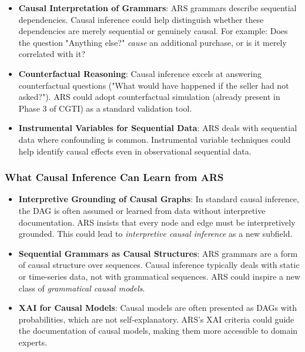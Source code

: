 \documentclass[12pt,a4paper]{article}
\begin{document}
\begin{itemize}
    \item \textbf{Causal Interpretation of Grammars}: ARS grammars describe 
    sequential dependencies. Causal inference could help distinguish whether 
    these dependencies are merely sequential or genuinely causal. For example: 
    Does the question "Anything else?" \textit{cause} an additional purchase, 
    or is it merely correlated with it?
    
    \item \textbf{Counterfactual Reasoning}: Causal inference excels at 
    answering counterfactual questions ("What would have happened if the 
    seller had not asked?"). ARS could adopt counterfactual simulation 
    (already present in Phase 3 of CGTI) as a standard validation tool.
    
    \item \textbf{Instrumental Variables for Sequential Data}: ARS deals with 
    sequential data where confounding is common. Instrumental variable 
    techniques could help identify causal effects even in observational 
    sequential data.
\end{itemize}

\subsubsection{What Causal Inference Can Learn from ARS}

\begin{itemize}
    \item \textbf{Interpretive Grounding of Causal Graphs}: In standard causal 
    inference, the DAG is often assumed or learned from data without interpretive 
    documentation. ARS insists that every node and edge must be interpretively 
    grounded. This could lead to \textit{interpretive causal inference} as a 
    new subfield.
    
    \item \textbf{Sequential Grammars as Causal Structures}: ARS grammars are 
    a form of causal structure over sequences. Causal inference typically 
    deals with static or time-series data, not with grammatical sequences. 
    ARS could inspire a new class of \textit{grammatical causal models}.
    
    \item \textbf{XAI for Causal Models}: Causal models are often presented 
    as DAGs with probabilities, which are not self-explanatory. ARS's XAI 
    criteria could guide the documentation of causal models, making them 
    more accessible to domain experts.
\end{itemize}
\end{document}
